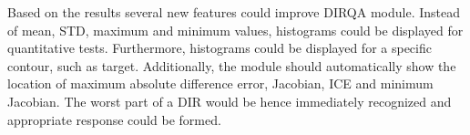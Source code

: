 Based on the results several new features could improve DIRQA module. Instead of mean, STD, maximum and minimum values, histograms could be displayed for quantitative tests.
Furthermore, histograms could be displayed for a specific contour, such as target. Additionally, the module should automatically show the location of maximum absolute difference error, Jacobian, ICE and minimum Jacobian.
The worst part of a DIR would be hence immediately recognized and appropriate response could be formed.  



